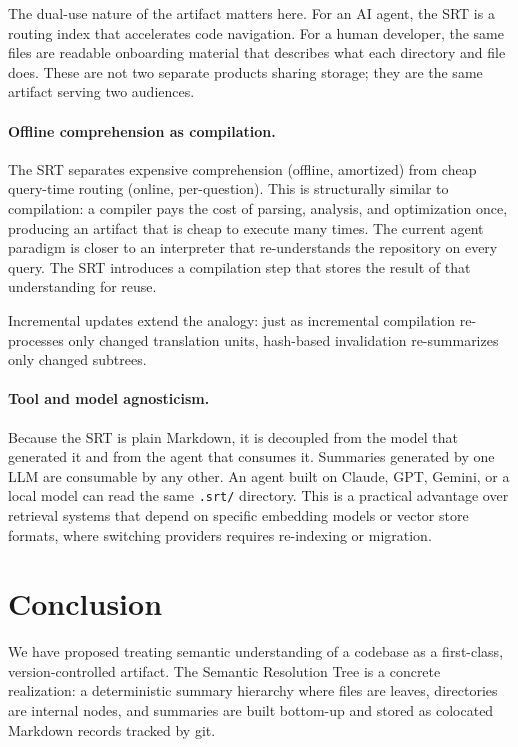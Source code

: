 \documentclass[11pt,a4paper]{article}
\newcommand{\srt}{\textsc{SRT}}
\begin{document}
The dual-use nature of the artifact matters here.
For an AI agent, the \srt{} is a routing index that accelerates code navigation.
For a human developer, the same files are readable onboarding material that describes what each directory and file does.
These are not two separate products sharing storage; they are the same artifact serving two audiences.

\paragraph{Offline comprehension as compilation.}
The \srt{} separates expensive comprehension (offline, amortized) from cheap query-time routing (online, per-question).
This is structurally similar to compilation: a compiler pays the cost of parsing, analysis, and optimization once, producing an artifact that is cheap to execute many times.
The current agent paradigm is closer to an interpreter that re-understands the repository on every query.
The \srt{} introduces a compilation step that stores the result of that understanding for reuse.

Incremental updates extend the analogy: just as incremental compilation re-processes only changed translation units, hash-based invalidation re-summarizes only changed subtrees.

\paragraph{Tool and model agnosticism.}
Because the \srt{} is plain Markdown, it is decoupled from the model that generated it and from the agent that consumes it.
Summaries generated by one LLM are consumable by any other.
An agent built on Claude, GPT, Gemini, or a local model can read the same \texttt{.srt/} directory.
This is a practical advantage over retrieval systems that depend on specific embedding models or vector store formats, where switching providers requires re-indexing or migration.


\section{Conclusion}\label{sec:conclusion}

We have proposed treating semantic understanding of a codebase as a first-class, version-controlled artifact.
The Semantic Resolution Tree is a concrete realization: a deterministic summary hierarchy where files are leaves, directories are internal nodes, and summaries are built bottom-up and stored as colocated Markdown records tracked by git.
\end{document}
